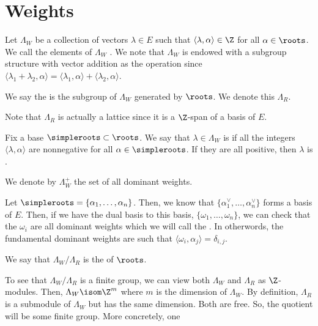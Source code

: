 \documentclass[11pt,leqno,oneside]{amsart}
\numberwithin{thm}{section}
\newcommand{\rootlattice}{\Lambda_R}
\newcommand{\weightlattice}{\Lambda_W}
\begin{document}
\section{Weights}
Let $\weightlattice$ be a collection of vectors $\lambda \in E$ such that
$\langle \lambda, \alpha \rangle \in \Z$ for all $\alpha \in
\roots$. We call the elements
of $\weightlattice$ . We note that 
$\weightlattice$ is endowed with a subgroup structure with vector addition as
the operation since $\langle
\lambda_1+\lambda_2, \alpha \rangle = \langle \lambda_1, \alpha
\rangle + \langle \lambda_2, \alpha \rangle$.
\begin{defn}
  We say the  is the subgroup of $\weightlattice$ generated
  by $\roots$. We denote this $\rootlattice$. 
\end{defn}
Note that $\rootlattice$ is actually a lattice since it is a $\Z$-span of
a basis of $E$.
\begin{defn}
  Fix a base $\simpleroots \subset \roots$. We say that $\lambda \in \weightlattice$
  is  if all the integers $\langle \lambda, \alpha
  \rangle$ are nonnegative for all $\alpha \in \simpleroots$. If they are
  all positive, then $\lambda$ is .
\end{defn}
We denote by $\weightlattice^+$ the set of all dominant weights.
\begin{defn}
  Let $\simpleroots = \{\alpha_1, \ldots, \alpha_n\}$. Then, we know that
  $\{\alpha_1^\vee, \ldots, \alpha_n^\vee\}$ forms a basis of
  $E$. Then, if we have the dual basis to this basis, $\{\omega_1,
  \ldots, \omega_n\}$, we can check that the $\omega_i$ are all
  dominant weights which we will call the . In otherwords, the
  fundamental dominant weights are such that \(\langle \omega_i,
  \alpha_j \rangle = \delta_{i,j}\). 
\end{defn}
\begin{defn}
  We say that $\weightlattice/\rootlattice$ is the  of
  $\roots$. 
\end{defn}
To see that $\weightlattice/\rootlattice$ is a finite group, we can  view both
$\weightlattice$ and $\rootlattice$ as $\Z$-modules. Then, $\weightlattice \isom \Z^m$
where $m$ is the dimension of $\weightlattice$. By definition, $\rootlattice$ is a
submodule of $\weightlattice$ but has the same dimension. Both are 
free. So, the quotient will be some finite group. More concretely, one
\end{document}
